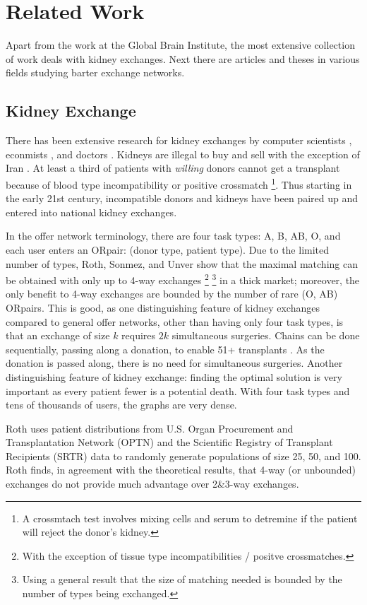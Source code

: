 \documentclass[main.tex]{subfiles}
\begin{document}
\section{Related Work}
Apart from the work at the Global Brain Institute, the most extensive collection of work deals with kidney exchanges. Next there are articles and theses in various fields studying barter exchange networks.

\subsection{Kidney Exchange}
There has been extensive research for kidney exchanges by computer scientists \cite{Bir}\cite{Abr1}, econmists \cite{Rot1}\cite{Rot2}, and doctors \cite{Seg1}. Kidneys are illegal to buy and sell with the exception of Iran \cite{Rot3}. At least a third of patients with \textit{willing} donors cannot get a transplant because of blood type incompatibility or positive crossmatch \cite{Seg1} \footnote{A crossmtach test involves mixing cells and serum to detremine if the patient will reject the donor's kidney.}. Thus starting in the early 21st century, incompatible donors and kidneys have been paired up and entered into national kidney exchanges.

In the offer network terminology, there are four task types: A, B, AB, O, and each user enters an ORpair: (donor type, patient type). Due to the limited number of types, Roth, Sonmez, and Unver \cite{Rot2} show that the maximal matching can be obtained with only up to 4-way exchanges \footnote{With the exception of tissue type incompatibilities / positve crossmatches.} \footnote{Using a general result that the size of matching needed is bounded by the number of types being exchanged.} in a thick market; moreover, the only benefit to 4-way exchanges are bounded by the number of rare (O, AB) ORpairs. This is good, as one distinguishing feature of kidney exchanges compared to general offer networks, other than having only four task types, is that an exchange of size $k$ requires $2k$ simultaneous surgeries. Chains can be done sequentially, passing along a donation, to enable 51+ transplants \cite{art:uab}. As the donation is passed along, there is no need for simultaneous surgeries. Another distinguishing feature of kidney exchange: finding the optimal solution is very important as every patient fewer is a potential death. With four task types and tens of thousands of users, the graphs are very dense.

Roth \cite{Rot2} uses patient distributions from U.S. Organ Procurement and Transplantation Network (OPTN) and the Scientific Registry of Transplant Recipients (SRTR) data to randomly generate populations of size 25, 50, and 100. Roth finds, in agreement with the theoretical results, that 4-way (or unbounded) exchanges do not provide much advantage over 2\&3-way exchanges.
\end{document}
